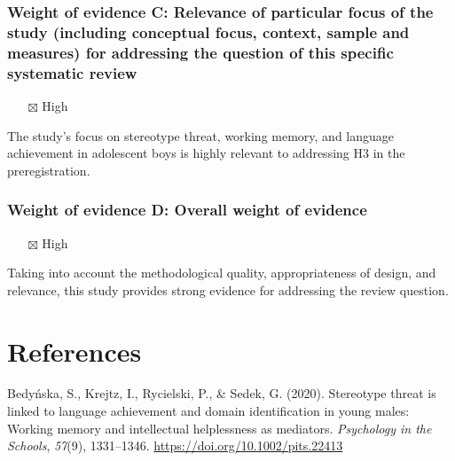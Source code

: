 \documentclass[
  doc, a4paper]{apa7}
\providecommand{\tightlist}{%
  \setlength{\itemsep}{0pt}\setlength{\parskip}{0pt}}
\newlength{\cslhangindent}
\newenvironment{CSLReferences}[2] %
 {\begin{list}{}{%
  \setlength{\itemindent}{0pt}
  \setlength{\leftmargin}{0pt}
  \setlength{\parsep}{0pt}
  \ifodd #1
   \setlength{\leftmargin}{\cslhangindent}
   \setlength{\itemindent}{-1\cslhangindent}
  \fi
  \setlength{\itemsep}{#2\baselineskip}}}
 {\end{list}}
\begin{document}
\subsubsection{Weight of evidence C: Relevance of particular focus of the study (including conceptual focus, context, sample and measures) for addressing the question of this specific systematic review}\label{weight-of-evidence-c-relevance-of-particular-focus-of-the-study-including-conceptual-focus-context-sample-and-measures-for-addressing-the-question-of-this-specific-systematic-review}

\begin{itemize}
\tightlist
\item[$\boxtimes$]
  High
\end{itemize}

The study's focus on stereotype threat, working memory, and language achievement in adolescent boys is highly relevant to addressing H3 in the preregistration.

\subsubsection{Weight of evidence D: Overall weight of evidence}\label{weight-of-evidence-d-overall-weight-of-evidence}

\begin{itemize}
\tightlist
\item[$\boxtimes$]
  High
\end{itemize}

Taking into account the methodological quality, appropriateness of design, and relevance, this study provides strong evidence for addressing the review question.

\section{References}\label{references}

\label{refs}
\begin{CSLReferences}{1}{0}
Bedyńska, S., Krejtz, I., Rycielski, P., \& Sedek, G. (2020). Stereotype threat is linked to language achievement and domain identification in young males: {Working} memory and intellectual helplessness as mediators. \emph{Psychology in the Schools}, \emph{57}(9), 1331--1346. \url{https://doi.org/10.1002/pits.22413}

\end{CSLReferences}
\end{document}

